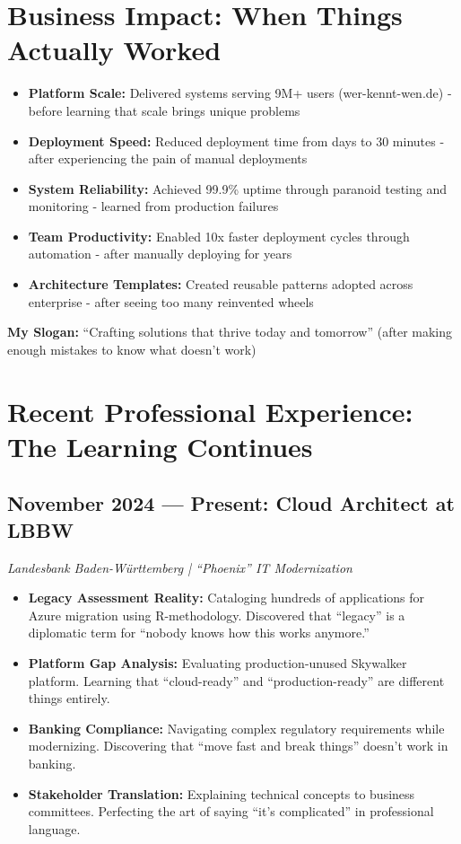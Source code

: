 \documentclass[11pt,a4paper]{article}
\begin{document}
\vspace{0.5em}

\section*{Business Impact: When Things Actually Worked}

\begin{itemize}[nosep,leftmargin=1.5em]
    \item \textbf{Platform Scale:} Delivered systems serving 9M+ users (wer-kennt-wen.de) - before learning that scale brings unique problems
    \item \textbf{Deployment Speed:} Reduced deployment time from days to 30 minutes - after experiencing the pain of manual deployments
    \item \textbf{System Reliability:} Achieved 99.9\% uptime through paranoid testing and monitoring - learned from production failures
    \item \textbf{Team Productivity:} Enabled 10x faster deployment cycles through automation - after manually deploying for years
    \item \textbf{Architecture Templates:} Created reusable patterns adopted across enterprise - after seeing too many reinvented wheels
\end{itemize}

\textbf{My Slogan:} ``Crafting solutions that thrive today and tomorrow'' (after making enough mistakes to know what doesn't work)

\newpage

\section*{Recent Professional Experience: The Learning Continues}

\subsection*{November 2024 --- Present: Cloud Architect at LBBW}
\textit{Landesbank Baden-Württemberg | ``Phoenix'' IT Modernization}

\begin{itemize}[nosep,leftmargin=1.5em]
    \item \textbf{Legacy Assessment Reality:} Cataloging hundreds of applications for Azure migration using R-methodology. Discovered that ``legacy'' is a diplomatic term for ``nobody knows how this works anymore.''
    \item \textbf{Platform Gap Analysis:} Evaluating production-unused Skywalker platform. Learning that ``cloud-ready'' and ``production-ready'' are different things entirely.
    \item \textbf{Banking Compliance:} Navigating complex regulatory requirements while modernizing. Discovering that ``move fast and break things'' doesn't work in banking.
    \item \textbf{Stakeholder Translation:} Explaining technical concepts to business committees. Perfecting the art of saying ``it's complicated'' in professional language.
\end{itemize}
\end{document}
